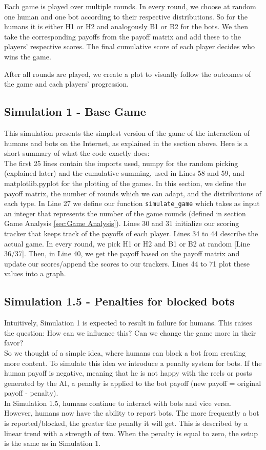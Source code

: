 \documentclass{article}
\begin{document}
Each game is played over multiple rounds. In every round, we choose at random one human and one bot according to their respective distributions. So for the humans it is either H1 or H2 and analogously B1 or B2 for the bots.
We then take the corresponding payoffs from the payoff matrix and add these to the players' respective scores. The final cumulative score of each player decides who wins the game.

After all rounds are played, we create a plot to visually follow the outcomes of the game and each players' progression.



\subsection{Simulation 1 - Base Game} \label{sec:Base Game}
This simulation presents the simplest version of the game of the interaction of humans and bots on the Internet, as explained in the section above. Here is a short summary of what the code exactly does:\\

The first 25 lines contain the imports used, numpy for the random picking (explained later) and the cumulative summing, used in Lines 58 and 59, and matplotlib.pyplot for the plotting of the games. In this section, we define the payoff matrix, the number of rounds which we can adapt, and the distributions of each type.
In Line 27 we define our function \texttt{simulate\_game} which takes as input an integer that represents the number of the game rounds (defined in section Game Analysis \ref{sec:Game Analysis}). 
Lines 30 and 31 initialize our scoring tracker that keeps track of the payoffs of each player.
Lines 34 to 44 describe the actual game. In every round, we pick H1 or H2 and B1 or B2 at random [Line 36/37]. Then, in Line 40, we get the payoff based on the payoff matrix and update our scores/append the scores to our trackers. 
Lines 44 to 71 plot these values into a graph. 



\subsection{Simulation 1.5 - Penalties for blocked bots}
Intuitively, Simulation 1 is expected to result in failure for humans. This raises the question: How can we influence this? Can we change the game more in their favor?\\
So we thought of a simple idea, where humans can block a bot from creating more content. To simulate this idea we introduce a penalty system for bots. If the human payoff is negative, meaning that he is not happy with the reels or posts generated by the AI, a penalty is applied to the bot payoff (new payoff = original payoff - penalty).\\
In Simulation 1.5, humans continue to interact with bots and vice versa. However, humans now have the ability to report bots. The more frequently a bot is reported/blocked, the greater the penalty it will get. This is described by a linear trend with a strength of two. When the penalty is equal to zero, the setup is the same as in Simulation 1. 
\end{document}
